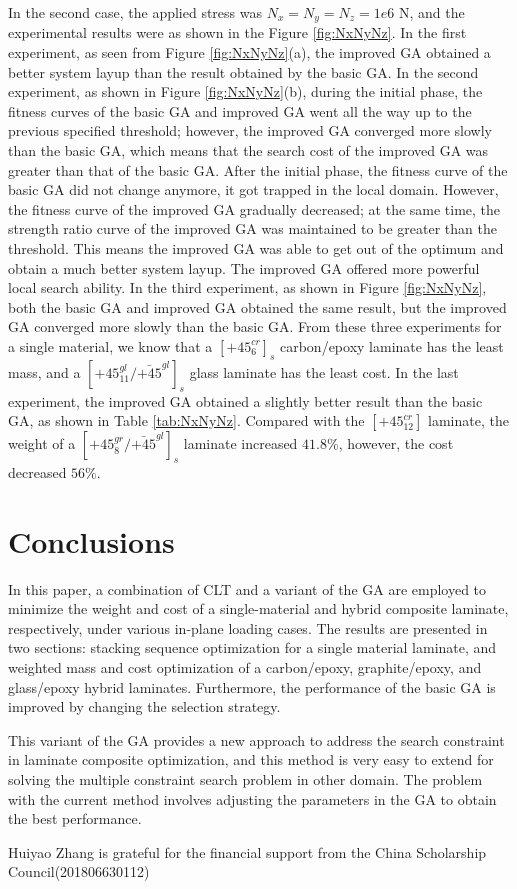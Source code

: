 \documentclass[Afour,sagev,times]{sagej}
\begin{document}
In the second case, the applied stress was $N_x=N_y=N_z=1e6$ N, and the experimental results were as
shown in the Figure \ref{fig:NxNyNz}. In the first experiment, as seen from Figure \ref{fig:NxNyNz}(a), the improved GA obtained a
better system layup than the result obtained by the basic GA. In the second experiment, as shown in Figure \ref{fig:NxNyNz}(b), during
the initial phase, the fitness curves of the basic GA and improved GA went all the way up to the
previous specified threshold; however, the improved GA converged more slowly than the basic GA, which
means that the search cost of the improved GA was greater than that of the basic GA. After the initial phase, the fitness
curve of the basic GA did not change anymore, it got trapped in the local domain.
 However, the fitness curve of the
improved GA gradually decreased; at the same time, the strength ratio curve of the improved GA
was maintained to be greater than the threshold. This means the improved GA was able to get out of the optimum
and obtain a much better system layup. The improved GA offered more powerful local search
ability. In the third experiment, as shown in Figure \ref{fig:NxNyNz}, both the basic GA and improved
GA obtained the same result, but the improved GA converged more slowly than the basic GA. From these
three experiments for a single material, we know that a $[\text{+}45_{6}^{cr}]_s$ carbon/epoxy laminate has
the least mass, and a $[\text{+}45_{11}^{gl}/\bar{\text{+}45}^{gl}]_s$ glass laminate has the least
cost. In the last experiment, the improved GA obtained a slightly better result than the basic GA,
as shown in Table \ref{tab:NxNyNz}. Compared with the $[\text{+}45_{12}^{cr}]$ laminate, the
weight of a $[\text{+}45_8^{gr}/\bar{\text{+}45}^{gl}]_s$ laminate increased $41.8\%$, however, the
cost decreased $56\%$.


\section{Conclusions}
In this paper, a combination of CLT and a variant of the GA are employed to minimize the weight and cost
of a single-material and hybrid composite laminate, respectively, under various in-plane loading
cases. The results are presented in two sections: stacking sequence optimization for a single material
laminate, and weighted mass and cost optimization of a carbon/epoxy, graphite/epoxy, and
glass/epoxy hybrid laminates. Furthermore, the performance of the basic GA is improved by changing the
selection strategy.

This variant of the GA provides a new approach to address the search constraint in laminate composite
optimization, and this method is very easy to extend for solving the multiple constraint search problem in other
domain. The problem with the current method involves adjusting the parameters in the GA to obtain the best
performance.

\begin{acks}
Huiyao Zhang is grateful for the financial support from the China Scholarship Council(201806630112)
\end{acks}



\end{document}
